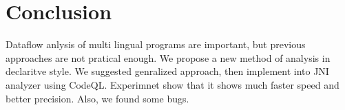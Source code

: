 \section{Conclusion}\label{sec:conclude}
Dataflow anlysis of multi lingual programs are important,
but previous approaches are not pratical enough.
We propose a new method of analysis in declaritve style.
We suggested genralized approach,
then implement into JNI analyzer using CodeQL.
Experimnet show that it shows much faster speed and better precision.
Also, we found some bugs.
